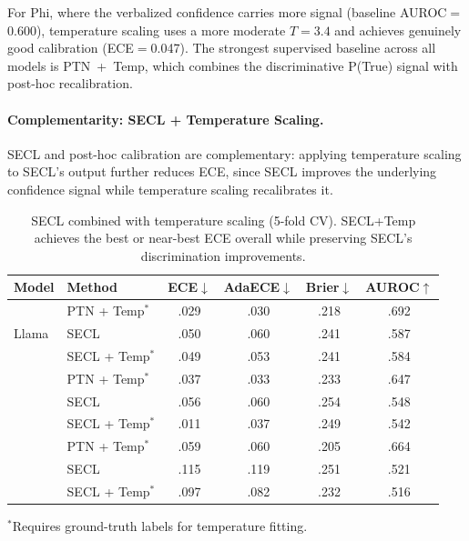 For Phi, where the verbalized confidence carries more signal 
(baseline AUROC$=$0.600), temperature scaling uses a more moderate 
$T{=}3.4$ and achieves genuinely good calibration (ECE$=$0.047).
The strongest supervised baseline across all models is PTN~+~Temp,
which combines the discriminative P(True) signal with post-hoc recalibration.

\paragraph{Complementarity: SECL + Temperature Scaling.}
SECL and post-hoc calibration are complementary: applying temperature 
scaling to SECL's output further reduces ECE, since SECL improves the 
underlying confidence signal while temperature scaling recalibrates it.

\begin{table}[h]
\centering
\caption{SECL combined with temperature scaling (5-fold CV).
SECL+Temp achieves the best or near-best ECE overall while preserving
SECL's discrimination improvements.}
\label{tab:secl_plus_temp}
\small
\begin{tabular}{@{}llcccc@{}}
\toprule
\textbf{Model} & \textbf{Method}
  & \textbf{ECE}$\downarrow$ & \textbf{AdaECE}$\downarrow$
  & \textbf{Brier}$\downarrow$ & \textbf{AUROC}$\uparrow$ \\
\midrule
\multirow{3}{*}{Llama}
  & PTN + Temp$^*$  & .029 & .030 & .218 & .692 \\
  & SECL            & .050 & .060 & .241 & .587 \\
  & SECL + Temp$^*$ & .049 & .053 & .241 & .584 \\
\addlinespace
\multirow{3}{*}{Gemma}
  & PTN + Temp$^*$  & .037 & .033 & .233 & .647 \\
  & SECL            & .056 & .060 & .254 & .548 \\
  & SECL + Temp$^*$ & .011 & .037 & .249 & .542 \\
\addlinespace
\multirow{3}{*}{Phi}
  & PTN + Temp$^*$  & .059 & .060 & .205 & .664 \\
  & SECL            & .115 & .119 & .251 & .521 \\
  & SECL + Temp$^*$ & .097 & .082 & .232 & .516 \\
\bottomrule
\end{tabular}
\vspace{0.3em}
\newline
{\footnotesize $^*$Requires ground-truth labels for temperature fitting.}
\end{table}

